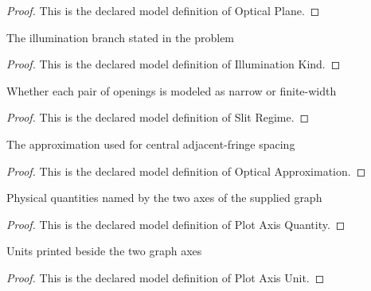 \begin{proof}
  This is the declared model definition of Optical Plane.
\end{proof}
\begin{definition}
  \label{def:physics:phyx-mini-0119:phyxminiproblems-problemphyxmini0119-illuminationkind}
  The illumination branch stated in the problem
\end{definition}
\begin{proof}
  This is the declared model definition of Illumination Kind.
\end{proof}
\begin{definition}
  \label{def:physics:phyx-mini-0119:phyxminiproblems-problemphyxmini0119-slitregime}
  Whether each pair of openings is modeled as narrow or finite-width
\end{definition}
\begin{proof}
  This is the declared model definition of Slit Regime.
\end{proof}
\begin{definition}
  \label{def:physics:phyx-mini-0119:phyxminiproblems-problemphyxmini0119-opticalapproximation}
  The approximation used for central adjacent-fringe spacing
\end{definition}
\begin{proof}
  This is the declared model definition of Optical Approximation.
\end{proof}
\begin{definition}
  \label{def:physics:phyx-mini-0119:phyxminiproblems-problemphyxmini0119-plotaxisquantity}
  Physical quantities named by the two axes of the supplied graph
\end{definition}
\begin{proof}
  This is the declared model definition of Plot Axis Quantity.
\end{proof}
\begin{definition}
  \label{def:physics:phyx-mini-0119:phyxminiproblems-problemphyxmini0119-plotaxisunit}
  Units printed beside the two graph axes
\end{definition}
\begin{proof}
  This is the declared model definition of Plot Axis Unit.
\end{proof}

